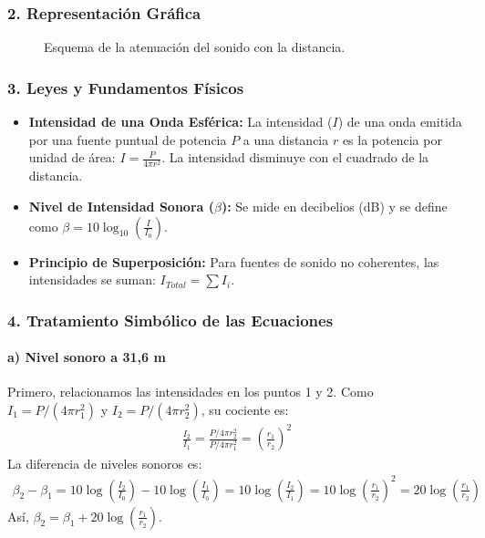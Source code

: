 \subsubsection*{2. Representación Gráfica}
\begin{figure}[H]
    \centering
    \caption{Esquema de la atenuación del sonido con la distancia.}
\end{figure}

\subsubsection*{3. Leyes y Fundamentos Físicos}
\begin{itemize}
    \item \textbf{Intensidad de una Onda Esférica:} La intensidad ($I$) de una onda emitida por una fuente puntual de potencia $P$ a una distancia $r$ es la potencia por unidad de área: $I = \frac{P}{4\pi r^2}$. La intensidad disminuye con el cuadrado de la distancia.
    \item \textbf{Nivel de Intensidad Sonora ($\beta$):} Se mide en decibelios (dB) y se define como $\beta = 10 \log_{10}\left(\frac{I}{I_0}\right)$.
    \item \textbf{Principio de Superposición:} Para fuentes de sonido no coherentes, las intensidades se suman: $I_{Total} = \sum I_i$.
\end{itemize}

\subsubsection*{4. Tratamiento Simbólico de las Ecuaciones}
\paragraph*{a) Nivel sonoro a 31,6 m}
Primero, relacionamos las intensidades en los puntos 1 y 2. Como $I_1 = P/(4\pi r_1^2)$ y $I_2 = P/(4\pi r_2^2)$, su cociente es:
\begin{gather}
    \frac{I_2}{I_1} = \frac{P/4\pi r_2^2}{P/4\pi r_1^2} = \left(\frac{r_1}{r_2}\right)^2
\end{gather}
La diferencia de niveles sonoros es:
\begin{gather}
    \beta_2 - \beta_1 = 10 \log\left(\frac{I_2}{I_0}\right) - 10 \log\left(\frac{I_1}{I_0}\right) = 10 \log\left(\frac{I_2}{I_1}\right) = 10 \log\left(\frac{r_1}{r_2}\right)^2 = 20 \log\left(\frac{r_1}{r_2}\right)
\end{gather}
Así, $\beta_2 = \beta_1 + 20 \log\left(\frac{r_1}{r_2}\right)$.

